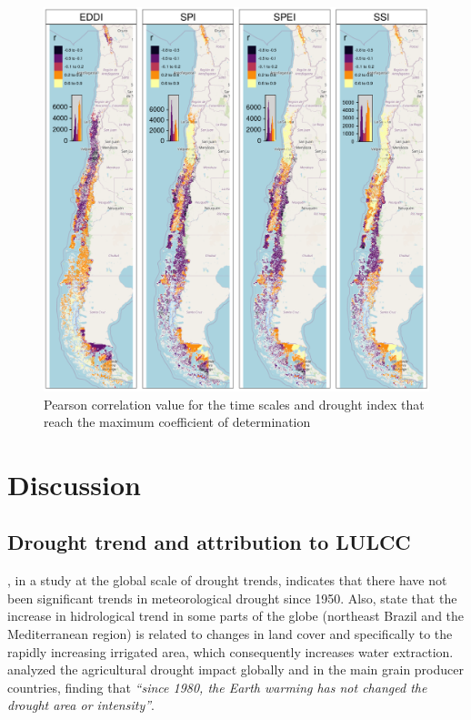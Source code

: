 \documentclass[
  authoryear,
  preprint,
  3p,
  onecolumn]{elsarticle}
\begin{document}
\begin{figure}[!ht]

{\centering \includegraphics{../output/figs/mapa_cor_r_indices_zcNDVI6.png}

}

\caption{\label{fig-corPerson}Pearson correlation value for the time
scales and drought index that reach the maximum coefficient of
determination}

\end{figure}

\hypertarget{discussion}{%
\section{Discussion}\label{discussion}}

\hypertarget{drought-trend-and-attribution-to-lulcc}{%
\subsection{Drought trend and attribution to
LULCC}\label{drought-trend-and-attribution-to-lulcc}}

\citet{Vicente-Serrano2021}, in a study at the global scale of drought
trends, indicates that there have not been significant trends in
meteorological drought since 1950. Also, state that the increase in
hidrological trend in some parts of the globe (northeast Brazil and the
Mediterranean region) is related to changes in land cover and
specifically to the rapidly increasing irrigated area, which
consequently increases water extraction. \citet{Kogan2020} analyzed the
agricultural drought impact globally and in the main grain producer
countries, finding that \emph{``since 1980, the Earth warming has not
changed the drought area or intensity''}.
\end{document}

